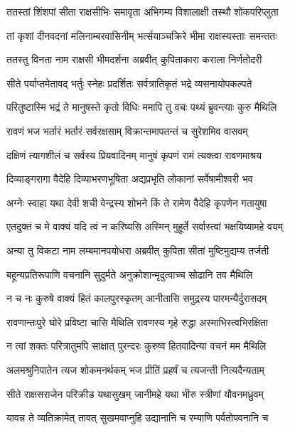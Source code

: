 \twolineshloka
{ततस्तां शिंशपां सीता राक्षसीभिः समावृता}
{अभिगम्य विशालाक्षी तस्थौ शोकपरिप्लुता} %

\twolineshloka
{तां कृशां दीनवदनां मलिनाम्बरवासिनीम्}
{भर्त्सयाञ्चक्रिरे भीमा राक्षस्यस्ताः समन्ततः} %

\twolineshloka
{ततस्तु विनता नाम राक्षसी भीमदर्शना}
{अब्रवीत् कुपिताकारा कराला निर्णतोदरी} %

\twolineshloka
{सीते पर्याप्तमेतावद् भर्तुः स्नेहः प्रदर्शितः}
{सर्वत्रातिकृतं भद्रे व्यसनायोपकल्पते} %

\twolineshloka
{परितुष्टास्मि भद्रं ते मानुषस्ते कृतो विधिः}
{ममापि तु वचः पथ्यं ब्रुवन्त्याः कुरु मैथिलि} %

\twolineshloka
{रावणं भज भर्तारं भर्तारं सर्वरक्षसाम्}
{विक्रान्तमापतन्तं च सुरेशमिव वासवम्} %

\twolineshloka
{दक्षिणं त्यागशीलं च सर्वस्य प्रियवादिनम्}
{मानुषं कृपणं रामं त्यक्त्वा रावणमाश्रय} %

\twolineshloka
{दिव्याङ्गरागा वैदेहि दिव्याभरणभूषिता}
{अद्यप्रभृति लोकानां सर्वेषामीश्वरी भव} %

\twolineshloka
{अग्नेः स्वाहा यथा देवी शची वेन्द्रस्य शोभने}
{किं ते रामेण वैदेहि कृपणेन गतायुषा} %

\twolineshloka
{एतदुक्तं च मे वाक्यं यदि त्वं न करिष्यसि}
{अस्मिन् मुहूर्ते सर्वास्त्वां भक्षयिष्यामहे वयम्} %

\twolineshloka
{अन्या तु विकटा नाम लम्बमानपयोधरा}
{अब्रवीत् कुपिता सीतां मुष्टिमुद्यम्य तर्जती} %

\twolineshloka
{बहून्यप्रतिरूपाणि वचनानि सुदुर्मते}
{अनुक्रोशान्मृदुत्वाच्च सोढानि तव मैथिलि} %

\twolineshloka
{न च नः कुरुषे वाक्यं हितं कालपुरस्कृतम्}
{आनीतासि समुद्रस्य पारमन्यैर्दुरासदम्} %

\twolineshloka
{रावणान्तःपुरे घोरे प्रविष्टा चासि मैथिलि}
{रावणस्य गृहे रुद्धा अस्माभिस्त्वभिरक्षिता} %

\twolineshloka
{न त्वां शक्तः परित्रातुमपि साक्षात् पुरन्दरः}
{कुरुष्व हितवादिन्या वचनं मम मैथिलि} %

\twolineshloka
{अलमश्रुनिपातेन त्यज शोकमनर्थकम्}
{भज प्रीतिं प्रहर्षं च त्यजन्ती नित्यदैन्यताम्} %

\twolineshloka
{सीते राक्षसराजेन परिक्रीड यथासुखम्}
{जानीमहे यथा भीरु स्त्रीणां यौवनमध्रुवम्} %

\twolineshloka
{यावन्न ते व्यतिक्रामेत् तावत् सुखमवाप्नुहि}
{उद्यानानि च रम्याणि पर्वतोपवनानि च} %

